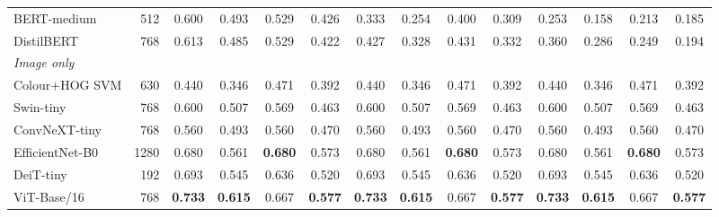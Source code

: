 \documentclass[conference]{IEEEtran}
\begin{document}
\begin{table}[t]
\begin{tabular}{lrcccccccccccc}
BERT-medium & 512 & 0.600 & 0.493 & 0.529 & 0.426 & 0.333 & 0.254 & 0.400 & 0.309 & 0.253 & 0.158 & 0.213 & 0.185\\
DistilBERT & 768 & 0.613 & 0.485 & 0.529 & 0.422 & 0.427 & 0.328 & 0.431 & 0.332 & 0.360 & 0.286 & 0.249 & 0.194\\
\midrule
\multicolumn{14}{l}{\emph{Image only}}\\
Colour$+$HOG SVM & 630 & 0.440 & 0.346 & 0.471 & 0.392 & 0.440 & 0.346 & 0.471 & 0.392 & 0.440 & 0.346 & 0.471 & 0.392\\
Swin-tiny & 768 & 0.600 & 0.507 & 0.569 & 0.463 & 0.600 & 0.507 & 0.569 & 0.463 & 0.600 & 0.507 & 0.569 & 0.463\\
ConvNeXT-tiny & 768 & 0.560 & 0.493 & 0.560 & 0.470 & 0.560 & 0.493 & 0.560 & 0.470 & 0.560 & 0.493 & 0.560 & 0.470\\
EfficientNet-B0 & 1280 & 0.680 & 0.561 & \textbf{0.680} & 0.573 & 0.680 & 0.561 & \textbf{0.680} & 0.573 & 0.680 & 0.561 & \textbf{0.680} & 0.573\\
DeiT-tiny & 192 & 0.693 & 0.545 & 0.636 & 0.520 & 0.693 & 0.545 & 0.636 & 0.520 & 0.693 & 0.545 & 0.636 & 0.520\\
ViT-Base/16 & 768 & \textbf{0.733} & \textbf{0.615} & 0.667 & \textbf{0.577} & \textbf{0.733} & \textbf{0.615} & 0.667 & \textbf{0.577} & \textbf{0.733} & \textbf{0.615} & 0.667 & \textbf{0.577}\\
\bottomrule
\end{tabular}
\end{table}
\end{document}
